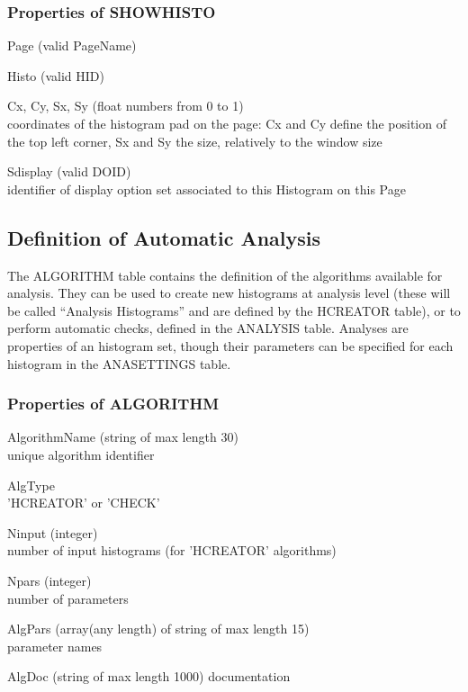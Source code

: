 \documentclass{lhcbnote}
\begin{document}
\subsubsection{Properties of SHOWHISTO}
\begin{description}
\item{Page} (valid PageName)
\item{Histo} (valid HID)
\item{Cx, Cy, Sx, Sy} (float numbers from 0 to 1)\\
coordinates of the histogram pad on the page: Cx and Cy define the
position of the top left corner, Sx and Sy the size, relatively to the
window size
\item{Sdisplay} (valid DOID)\\
identifier of display option set associated to this Histogram on this Page
\end{description}

\subsection{Definition of Automatic Analysis}
The ALGORITHM table contains the definition of the algorithms
available for analysis. They can be used to create new histograms at
analysis level (these will be called ``Analysis Histograms'' and are
defined by the HCREATOR table), or to perform automatic checks,
defined in the ANALYSIS table. Analyses are properties of an histogram
set, though their parameters can be specified for each histogram in
the ANASETTINGS table.

\subsubsection{Properties of ALGORITHM}
\begin{description}
\item{AlgorithmName} (string of max length 30)\\
unique algorithm identifier
\item{AlgType} \\
'HCREATOR' or 'CHECK'
\item{Ninput} (integer)\\
number of input histograms (for 'HCREATOR' algorithms)
\item{Npars} (integer)\\
number of parameters
\item{AlgPars} (array(any length) of string of max length 15)\\
parameter names
\item{AlgDoc} (string of max length 1000)
documentation
\end{description}
\end{document}
